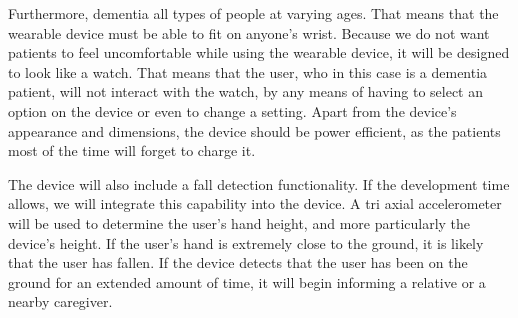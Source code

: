 Furthermore, dementia all types of people at varying ages. That means that the
wearable device must be able to fit on anyone's wrist. Because we do not want
patients to feel uncomfortable while using the wearable device, it will be
designed to look like a watch. That means that the user, who in this case is a
dementia patient, will not interact with the watch, by any means of having to
select an option on the device or even to change a setting. Apart from the
device's appearance and dimensions, the device should be power efficient, as the
patients most of the time will forget to charge it.

The device will also include a fall detection functionality. If the development
time allows, we will integrate this capability into the device. A tri axial
accelerometer will be used to determine the user's hand height, and more
particularly the device's height. If the user's hand is extremely close to the
ground, it is likely that the user has fallen. If the device detects that the
user has been on the ground for an extended amount of time, it will begin
informing a relative or a nearby caregiver.
